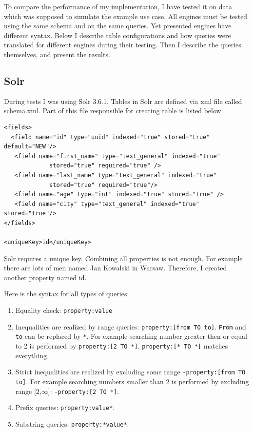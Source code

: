 \documentclass[10pt,a4paper]{article}
\begin{document}
To compare the performance of my implementation, I have tested it on data which was supposed to simulate the example use case. All engines must be tested using the same schema and on the same queries. Yet presented engines have different syntax. Below I describe table configurations and how queries were translated for different engines during their testing. Then I describe the queries themselves, and present the results.

\subsection{Solr}

During tests I was using Solr 3.6.1. Tables in Solr are defined via xml file called schema.xml. Part of this file responsible for creating table is listed below.

\begin{verbatim}
<fields>
  <field name="id" type="uuid" indexed="true" stored="true" default="NEW"/>
   <field name="first_name" type="text_general" indexed="true"
             stored="true" required="true" /> 
   <field name="last_name" type="text_general" indexed="true" 
             stored="true" required="true"/>
   <field name="age" type="int" indexed="true" stored="true" /> 
   <field name="city" type="text_general" indexed="true" stored="true"/>
</fields>

<uniqueKey>id</uniqueKey> 
\end{verbatim}

Solr requires a unique key. Combining all properties is not enough. For example there are lots of men named Jan Kowalski in Warsaw. Therefore, I created another property named id.

\bigskip
Here is the syntax for all types of queries:
\begin{enumerate}
\item Equality check: \verb|property:value|
\item Inequalities are realized by range queries: \verb|property:[from TO to]|. \verb|From| and \verb|to| can be replaced by \verb|*|. For example searching number greater then or equal to 2 is performed by \verb|property:[2 TO *]|. \verb|property:[* TO *]| matches everything.
\item Strict inequalities are realized by excluding some range \verb|-property:[from TO to]|. For example searching numbers smaller than 2 is performed by excluding range [2,$\infty$]: \verb|-property:[2 TO *]|.
\item Prefix queries: \verb|property:value*|.
\item Substring queries: \verb|property:*value*|.
 
\end{enumerate}
\end{document}
